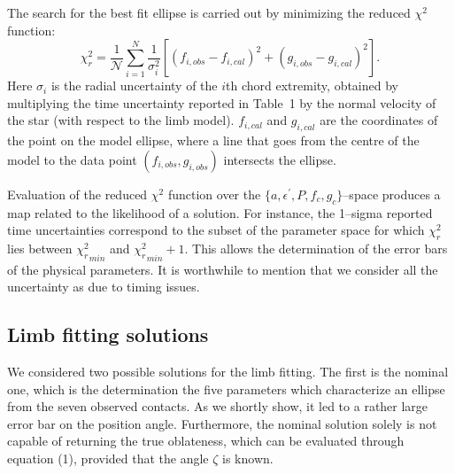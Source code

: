 \documentclass[useAMS,usenatbib]{mn2e}
\begin{document}
The search for the best fit ellipse is carried out by minimizing the reduced $\chi^2$ function:
%
\begin{equation}
\chi^2_r = \frac{1}{\mathcal{N}} \sum_{i=1}^N \frac{1}{\sigma_i^2}  \left[ (f_{i,obs}-f_{i,cal})^2 + (g_{i,obs}-g_{i,cal})^2\right].
\end{equation}
%
Here $\sigma_i$ is the radial uncertainty of the $i$th chord extremity, obtained by multiplying the time uncertainty reported in Table~1 by the normal velocity of the star (with respect to the limb model). $f_{i,cal}$ and $g_{i,cal}$ are the coordinates of the point on the model ellipse, where a line that goes from the centre of the model to the data point $(f_{i,obs},g_{i,obs})$ intersects the ellipse.%
%
%
%

Evaluation of the reduced $\chi^2$ function over the $\lbrace a, \epsilon^\prime, P, f_c, g_c \rbrace$--space produces a map related to the likelihood of a solution. For instance, the 1--sigma reported time uncertainties correspond to the subset of the parameter space for which $\chi^2_r$ lies between ${\chi^2_r}_{min}$ and ${\chi^2_r}_{min} + 1$. This allows the determination of the error bars of the physical parameters. It is worthwhile to mention that we consider all the uncertainty as due to timing issues.





\subsection{Limb fitting solutions}

We considered two possible solutions for the limb fitting. The first is the nominal one, which is the determination the five parameters which characterize an ellipse from the seven observed contacts. As we shortly show, it led to a rather large error bar on the position angle. Furthermore, the nominal solution solely is not capable of returning the true oblateness, which can be evaluated through equation (1), provided that the angle $\zeta$ is known.%
\end{document}
